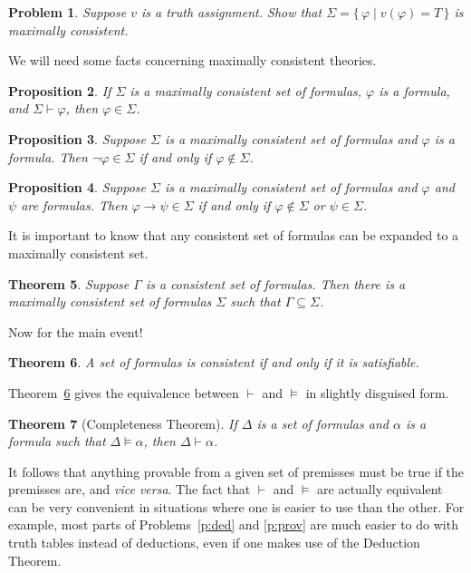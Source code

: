 \documentclass[12pt]{amsbook}
\newcommand{\proves}{\vdash}
\theoremstyle{plain}
\newtheorem{thm}{Theorem}[chapter]
\newtheorem{prop}[thm]{Proposition}
\newtheorem{prob}[thm]{Problem}
\theoremstyle{definition}
\theoremstyle{remark}
\begin{document}
\begin{prob} \label{p:emc}
Suppose $v$ is a truth assignment.  Show that $\Sigma = \{\, \varphi \mid v(\varphi) = T \,\}$ is maximally consistent.
\end{prob}

We will need some facts concerning maximally consistent theories.

\begin{prop} \label{p:inmc}
If $\Sigma$ is a maximally consistent set of formulas,  $\varphi$ is a formula,  and $\Sigma \proves \varphi$,  then $\varphi \in \Sigma$.
\end{prop}

\begin{prop} \label{p:nimc}
Suppose $\Sigma$ is a maximally consistent set of formulas and $\varphi$ is a formula.  Then $\lnot\varphi \in \Sigma$ if and only if $\varphi \notin \Sigma$.
\end{prop}

\begin{prop} \label{p:iimc}
Suppose $\Sigma$ is a maximally consistent set of formulas and $\varphi$ and $\psi$ are formulas.  Then $\varphi \to \psi \in \Sigma$ if and only if $\varphi \notin \Sigma$ or $\psi \in \Sigma$.
\end{prop}

It is important to know that any consistent set of formulas can be expanded to a maximally consistent set.

\begin{thm} \label{t:exmc}
Suppose $\Gamma$ is a consistent set of formulas.  Then there is a maximally consistent set of formulas $\Sigma$ such that $\Gamma \subseteq \Sigma$.
\end{thm}

Now for the main event!

\begin{thm} \label{t:saco}
A set of formulas is consistent if and only if it is satisfiable.
\end{thm}

Theorem~\ref{t:saco} gives the equivalence between $\proves$ and $\models$ in slightly disguised form. 

\begin{thm}[Completeness Theorem] \label{t:pcmpl} 
If $\Delta$ is a set of formulas and $\alpha$ is a formula such that $\Delta \models \alpha$,  then $\Delta \proves \alpha$.
\end{thm}

It follows that anything provable from a given set of premisses must be true if the premisses are,  and {\em vice versa\/}.  The fact that $\proves$ and $\models$ are actually equivalent can be very convenient in situations where one is easier to use than the other.  For example,  most parts of Problems~\ref{p:ded} and \ref{p:prov} are much easier to do with truth tables instead of deductions,  even if one makes use of the Deduction Theorem.
\end{document}
